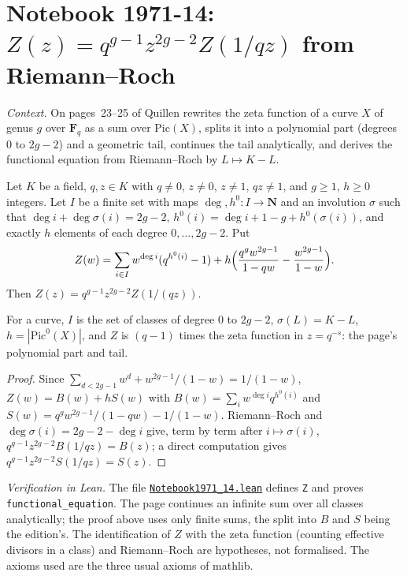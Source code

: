 \section[Notebook 1971-14: the functional equation of the zeta function of a curve]{Notebook 1971-14: $Z(z) = q^{g-1}z^{2g-2}Z(1/qz)$ from Riemann--Roch\protect{}}\label{sec:quillen-1971-14}

\emph{Context.} On pages~23--25 of  Quillen rewrites the zeta function of a curve $X$ of genus $g$ over $\mathbf F_q$ as a sum over $\mathrm{Pic}(X)$, splits it into a polynomial part (degrees $0$ to $2g - 2$) and a geometric tail, continues the tail analytically, and derives the functional equation from Riemann--Roch by $L \mapsto K - L$.

\begin{encadre}
\begin{theoreme}\label{thm:quillen-1971-14}
Let $K$ be a field, $q, z \in K$ with $q \ne 0$, $z \ne 0$, $z \ne 1$, $qz \ne 1$, and $g \ge 1$, $h \ge 0$ integers. Let $I$ be a finite set with maps $\deg, h^0 : I \to \mathbf N$ and an involution $\sigma$ such that $\deg i + \deg\sigma(i) = 2g - 2$, $h^0(i) = \deg i + 1 - g + h^0(\sigma(i))$, and exactly $h$ elements of each degree $0, \dots, 2g - 2$. Put
\[Z(w) = \sum_{i \in I}w^{\deg i}(q^{h^0(i)} - 1) + h\Bigl(\frac{q^gw^{2g-1}}{1 - qw} - \frac{w^{2g-1}}{1 - w}\Bigr).\]
Then $Z(z) = q^{g-1}z^{2g-2}Z(1/(qz))$.
\end{theoreme}
\end{encadre}

For a curve, $I$ is the set of classes of degree $0$ to $2g - 2$, $\sigma(L) = K - L$, $h = |\mathrm{Pic}^0(X)|$, and $Z$ is $(q - 1)$ times the zeta function in $z = q^{-s}$: the page's polynomial part and tail.

\begin{proof}
Since $\sum_{d < 2g - 1}w^d + w^{2g-1}/(1 - w) = 1/(1 - w)$, $Z(w) = B(w) + hS(w)$ with $B(w) = \sum_iw^{\deg i}q^{h^0(i)}$ and $S(w) = q^gw^{2g-1}/(1 - qw) - 1/(1 - w)$. Riemann--Roch and $\deg\sigma(i) = 2g - 2 - \deg i$ give, term by term after $i \mapsto \sigma(i)$, $q^{g-1}z^{2g-2}B(1/qz) = B(z)$; a direct computation gives $q^{g-1}z^{2g-2}S(1/qz) = S(z)$.
\end{proof}

\emph{Verification in Lean.} The file \href{\leanblobmain/Notebook1971_14.lean}{\texttt{Notebook1971\_14.\allowbreak{}lean}} defines \texttt{Z} and proves \texttt{functional\_equation}. The page continues an infinite sum over all classes analytically; the proof above uses only finite sums, the split into $B$ and $S$ being the edition's. The identification of $Z$ with the zeta function (counting effective divisors in a class) and Riemann--Roch are hypotheses, not formalised. The axioms used are the three usual axioms of mathlib.

